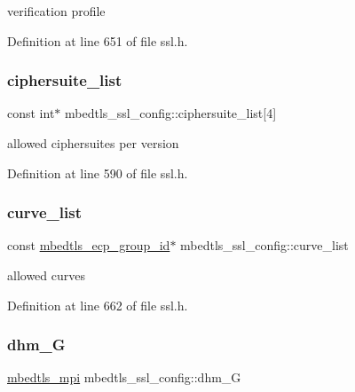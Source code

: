 verification profile 

Definition at line 651 of file ssl.\+h.

\mbox{\label{structmbedtls__ssl__config_a15e716727b7dd508dfb96e270f37919f}} 
\subsubsection{\texorpdfstring{ciphersuite\+\_\+list}{ciphersuite\_list}}
{\footnotesize\ttfamily const int$\ast$ mbedtls\+\_\+ssl\+\_\+config\+::ciphersuite\+\_\+list\mbox{[}4\mbox{]}}

allowed ciphersuites per version 

Definition at line 590 of file ssl.\+h.

\mbox{\label{structmbedtls__ssl__config_a388e40cfcaadba5c07bf625c7dba18e0}} 
\subsubsection{\texorpdfstring{curve\+\_\+list}{curve\_list}}
{\footnotesize\ttfamily const \mbox{\hyperlink{ecp_8h_af79e530ea8f8416480f805baa20b1a2d}{mbedtls\+\_\+ecp\+\_\+group\+\_\+id}}$\ast$ mbedtls\+\_\+ssl\+\_\+config\+::curve\+\_\+list}

allowed curves 

Definition at line 662 of file ssl.\+h.

\mbox{\label{structmbedtls__ssl__config_af0d45b3fc7171e48a08d904b7383fbba}} 
\subsubsection{\texorpdfstring{dhm\+\_\+G}{dhm\_G}}
{\footnotesize\ttfamily \mbox{\hyperlink{structmbedtls__mpi}{mbedtls\+\_\+mpi}} mbedtls\+\_\+ssl\+\_\+config\+::dhm\+\_\+G}

